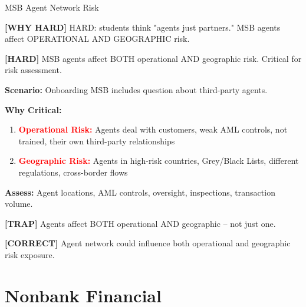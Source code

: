 \documentclass[6pt,aspectratio=169,fontsize=5pt]{beamer}
\renewcommand{\tiny}{\fontsize{3.5pt}{4.5pt}\selectfont}
\renewcommand{\normalsize}{\fontsize{7.5pt}{8.5pt}\selectfont}
\newcommand{\trap}[1]{%
	\begin{block}{\textcolor{redtrap}{\textbf{[TRAP]}}}
		\textcolor{redtrap}{\tiny #1}
	\end{block}
}
\newcommand{\correct}[1]{%
	\begin{block}{\textcolor{greencorrect}{\textbf{[CORRECT]}}}
		\textcolor{greencorrect}{\tiny #1}
	\end{block}
}
\newcommand{\hard}[1]{%
	\begin{block}{\textcolor{hardcolor}{\textbf{[HARD]}}}
		\textcolor{hardcolor}{\tiny #1}
	\end{block}
}
\newcommand{\hardexplain}[1]{%
	\begin{block}{\textcolor{orangehard}{\textbf{[WHY HARD]}}}
		\textcolor{orangehard}{\tiny #1}
	\end{block}
}
\begin{document}
	\begin{frame}{\normalsize MSB Agent Network Risk}
		
		\hardexplain{HARD: students think "agents just partners." MSB agents affect OPERATIONAL AND GEOGRAPHIC risk.}
		
		\hard{MSB agents affect BOTH operational AND geographic risk. Critical for risk assessment.}
		
		\textbf{Scenario:} Onboarding MSB includes question about third-party agents.
		
		\textbf{Why Critical:}
		\begin{enumerate}
			\item \textcolor{red}{\textbf{Operational Risk:}} Agents deal with customers, weak AML controls, not trained, their own third-party relationships
			\item \textcolor{red}{\textbf{Geographic Risk:}} Agents in high-risk countries, Grey/Black Lists, different regulations, cross-border flows
		\end{enumerate}
		
		\textbf{Assess:} Agent locations, AML controls, oversight, inspections, transaction volume.
		
		\trap{Agents affect BOTH operational AND geographic -- not just one.}
		
		\correct{Agent network could influence both operational and geographic risk exposure.}
	\end{frame}
	
	\section{Nonbank Financial}
	
\end{document}
